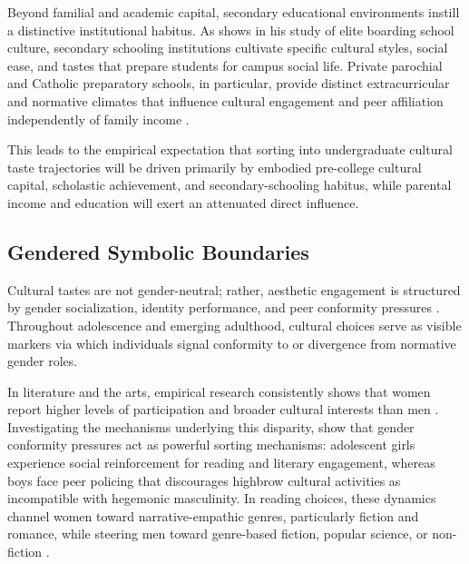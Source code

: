 \documentclass[12pt]{article}
\begin{document}
Beyond familial and academic capital, secondary educational environments instill a distinctive institutional habitus. As \citet{khan2011privilege-68a} shows in his study of elite boarding school culture, secondary schooling institutions cultivate specific cultural styles, social ease, and tastes that prepare students for campus social life. Private parochial and Catholic preparatory schools, in particular, provide distinct extracurricular and normative climates that influence cultural engagement and peer affiliation independently of family income \citep{schmutz2016cultural}.

This leads to the empirical expectation that sorting into undergraduate cultural taste trajectories will be driven primarily by embodied pre-college cultural capital, scholastic achievement, and secondary-schooling habitus, while parental income and education will exert an attenuated direct influence.

\subsection{Gendered Symbolic Boundaries}

Cultural tastes are not gender-neutral; rather, aesthetic engagement is structured by gender socialization, identity performance, and peer conformity pressures \citep{schmutz2016cultural,lagaert2017engendering,nous2021multidimensional}. Throughout adolescence and emerging adulthood, cultural choices serve as visible markers via which individuals signal conformity to or divergence from normative gender roles.

In literature and the arts, empirical research consistently shows that women report higher levels of participation and broader cultural interests than men \citep{lizardo2006puzzle,schmutz2016cultural}. Investigating the mechanisms underlying this disparity, \citet{lagaert2017engendering} show that gender conformity pressures act as powerful sorting mechanisms: adolescent girls experience social reinforcement for reading and literary engagement, whereas boys face peer policing that discourages highbrow cultural activities as incompatible with hegemonic masculinity. In reading choices, these dynamics channel women toward narrative-empathic genres, particularly fiction and romance, while steering men toward genre-based fiction, popular science, or non-fiction \citep{kraaykamp2003literary,chalari2022adolescents}.
\end{document}
